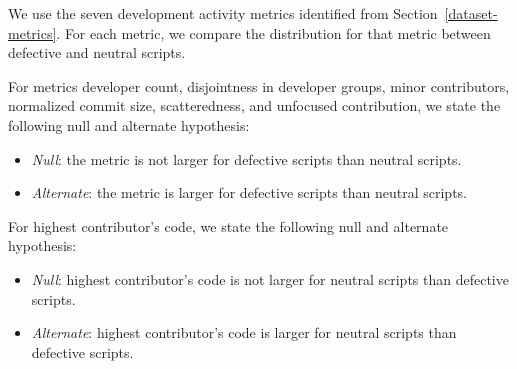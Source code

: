 \documentclass[smallextended]{svjour3}       %
\begin{document}
We use the seven development activity metrics identified from Section~\ref{dataset-metrics}. For each metric, we compare the distribution for that metric between defective and neutral scripts.

For metrics developer count, disjointness in developer groups, minor contributors, normalized commit size, scatteredness, and unfocused contribution, we state the following null and alternate hypothesis:  

\begin{itemize}
    \item{\textit{Null}:      the metric is not larger for defective scripts than neutral scripts.} 
    \item{\textit{Alternate}: the metric is larger for defective scripts than neutral scripts.} 
\end{itemize}

For highest contributor's code, we state the following null and alternate hypothesis:  

\begin{itemize}
    \item{\textit{Null}:      highest contributor's code is not larger for neutral scripts than defective scripts.} 
    \item{\textit{Alternate}: highest contributor's code is larger for neutral scripts than defective scripts.} 
\end{itemize}
\end{document}
